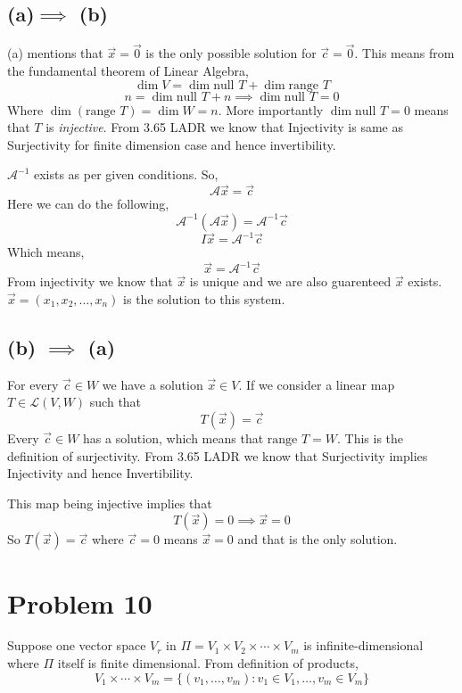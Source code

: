 \documentclass[letter]{article}
\begin{document}
	\subsection*{(a)$\implies$ (b)}

(a) mentions that $\vec{x}=\vec{0}$ is the only possible solution for $\vec{c} = \vec{0}$. This means from the fundamental theorem of Linear Algebra, 
\[
\dim V = \dim \text{null } T + \dim \text{range } T
\]
\[
n = \dim \text{null }T + n \implies \dim \text{null }T = 0
\]
Where $\dim (\text{range } T) = \dim W = n$. More importantly $\dim \text{null }T = 0$ means that $T$ is \emph{injective}. From 3.65 LADR we know that Injectivity is same as Surjectivity for finite dimension case and hence invertibility. 

$\mathcal A^{-1}$ exists as per given conditions. So, 
\[
\mathcal A \vec{x} = \vec{c}
\]
Here we can do the following, 
\[
\mathcal A^{-1} \left(\mathcal A \vec{x}\right) = \mathcal A^{-1} \vec{c}
\] 
\[
I \vec{x} = \mathcal A^{-1} \vec{c}
\]
Which means, 
\[
\vec{x} = \mathcal A^{-1} \vec{c}
\]
From injectivity we know that $\vec{x}$ is unique and we are also guarenteed $\vec{x}$ exists. $\vec{x} = (x_1, x_2, \ldots, x_n)$ is the solution to this system. 

\subsection*{(b) $\implies$ (a)} 
For every $\vec{c} \in W$ we have a solution $\vec{x} \in V$. If we consider a linear map $T \in \mathcal L(V,W)$ such that
 \[
T(\vec{x}) = \vec{c}
\] 
Every $\vec{c} \in W$ has a solution, which means that  $\text{range } T = W$. This is the definition of surjectivity. From 3.65 LADR we know that Surjectivity implies Injectivity and hence Invertibility. 

This map being injective implies that 
\[
T(\vec{x}) = 0 \implies \vec{x} = 0
\]
So $T(\vec{x}) = \vec{c}$ where $\vec{c} = 0$ means $\vec{x} = 0$ and that is the only solution.

\section*{Problem 10} 
Suppose one vector space $V_r$ in $\Pi = V_1 \times V_2 \times  \cdots \times V_m$ is infinite-dimensional where $\Pi$ itself is finite dimensional. From definition of products, 
\[
V_1 \times \cdots \times V_m = 
\{(v_1, \ldots, v_m) : v_1 \in V_1 , \ldots, v_m \in V_m\} 
\]
\end{document}
